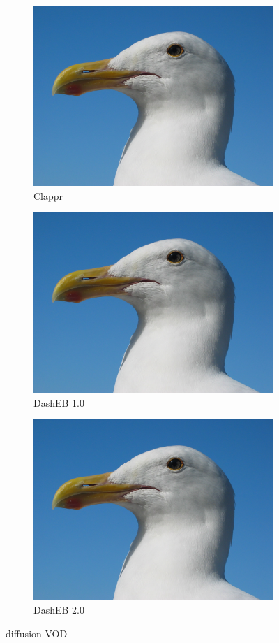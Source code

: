 
  \begin{figure}
      
        \begin{subfigure}[b]{1\textwidth}
            \parbox[b]{.5\linewidth}{
            \includegraphics[height=0.2\textwidth]{images/gull}
            }
            \parbox[b]{.4\linewidth}{
                \caption{Clappr}
            }
        \end{subfigure}
        
        \begin{subfigure}[b]{1\textwidth}
            \parbox[b]{.5\linewidth}{
                \includegraphics[height=0.2\textwidth]{images/gull}
            }
            \parbox[b]{.4\linewidth}{
                \caption{DashEB 1.0}
            }
        \end{subfigure}
        
        \begin{subfigure}[b]{1\textwidth}
            \parbox[b]{.5\linewidth}{
                \includegraphics[height=0.2\textwidth]{images/gull}
            }
            \parbox[b]{.4\linewidth}{
                \caption{DashEB 2.0}
            }
        \end{subfigure}
      
      \caption{diffusion VOD}
    \end{figure}




